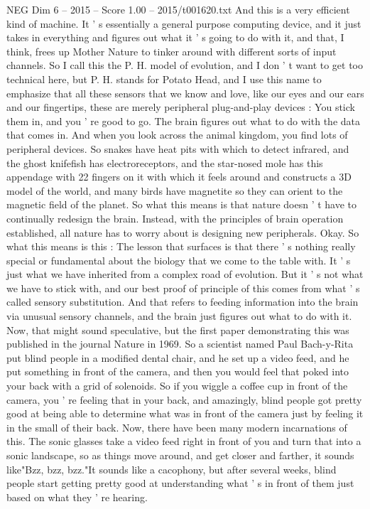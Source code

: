 \begin{textsample}{NEG Dim 6 – 2015 – Score 1.00 – 2015/t001620.txt}
And this is a very efficient kind of machine.
It ' s essentially a general purpose computing device, and it just takes in everything and figures out what it ' s going to do with it, and that, I think, frees up Mother Nature to tinker around with different sorts of input channels.
So I call this the P.
H. model of evolution, and I don ' t want to get too technical here, but P.
H. stands for Potato Head, and I use this name to emphasize that all these sensors that we know and love, like our eyes and our ears and our fingertips, these are merely peripheral plug-and-play devices : You stick them in, and you ' re good to go.
The brain figures out what to do with the data that comes in.
And when you look across the animal kingdom, you find lots of peripheral devices.
So snakes have heat pits with which to detect infrared, and the ghost knifefish has electroreceptors, and the star-nosed mole has this appendage with 22 fingers on it with which it feels around and constructs a 3D model of the world, and many birds have magnetite so they can orient to the magnetic field of the planet.
So what this means is that nature doesn ' t have to continually redesign the brain.
Instead, with the principles of brain operation established, all nature has to worry about is designing new peripherals.
Okay.
So what this means is this : The lesson that surfaces is that there ' s nothing really special or fundamental about the biology that we come to the table with.
It ' s just what we have inherited from a complex road of evolution.
But it ' s not what we have to stick with, and our best proof of principle of this comes from what ' s called sensory substitution.
And that refers to feeding information into the brain via unusual sensory channels, and the brain just figures out what to do with it.
Now, that might sound speculative, but the first paper demonstrating this was published in the journal Nature in 1969.
So a scientist named Paul Bach-y-Rita put blind people in a modified dental chair, and he set up a video feed, and he put something in front of the camera, and then you would feel that poked into your back with a grid of solenoids.
So if you wiggle a coffee cup in front of the camera, you ' re feeling that in your back, and amazingly, blind people got pretty good at being able to determine what was in front of the camera just by feeling it in the small of their back.
Now, there have been many modern incarnations of this.
The sonic glasses take a video feed right in front of you and turn that into a sonic landscape, so as things move around, and get closer and farther, it sounds like"Bzz, bzz, bzz."It sounds like a cacophony, but after several weeks, blind people start getting pretty good at understanding what ' s in front of them just based on what they ' re hearing.

\end{textsample}
